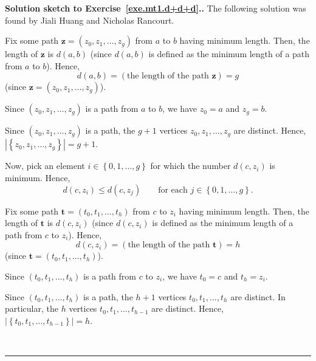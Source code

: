 \documentclass[numbers=enddot,12pt,final,onecolumn,notitlepage]{scrartcl}%
\theoremstyle{definition}
\newenvironment{proof}[1][Proof]{\noindent\textbf{#1.} }{\ \rule{0.5em}{0.5em}}
\newcommand{\set}[1]{\left\{ #1 \right\}}
\newcommand{\abs}[1]{\left| #1 \right|}
\newcommand{\tup}[1]{\left( #1 \right)}
\begin{document}
\begin{proof}[Solution sketch to Exercise~\ref{exe.mt1.d+d+d}.]
The following solution was found by Jiali Huang and
Nicholas Rancourt.

Fix some path $\mathbf{z} = \tup{z_0, z_1, \ldots, z_g}$ from
$a$ to $b$ having minimum length. Then, the length of $\mathbf{z}$ is
$d \tup{a, b}$ (since $d \tup{a, b}$ is defined as the minimum
length of a path from $a$ to $b$). Hence,
\begin{equation}
d \tup{a, b}
= \tup{\text{the length of the path } \mathbf{z}}
= g
\label{pf.exe.mt1.d+d+d.walk0}
\end{equation}
(since $\mathbf{z} = \tup{z_0, z_1, \ldots, z_g}$).

Since $\tup{z_0, z_1, \ldots, z_g}$ is a path from $a$ to $b$,
we have $z_0 = a$ and $z_g = b$.

Since $\tup{z_0, z_1, \ldots, z_g}$ is a path, the $g+1$
vertices $z_0, z_1, \ldots, z_g$ are distinct. Hence,
$\abs{\set{z_0, z_1, \ldots, z_g}} = g+1$.

Now, pick an element $i \in \set{0, 1, \ldots, g}$ for which the
number $d \tup{c, z_i}$ is minimum. Hence,
\begin{equation}
d \tup{c, z_i} \leq d \tup{c, z_j}
\qquad \text{for each } j \in \set{0, 1, \ldots, g} .
\label{sol.mt1.d+d+d.zi-minimum}
\end{equation}

Fix some path $\mathbf{t} = \tup{t_0, t_1, \ldots, t_h}$ from
$c$ to $z_i$ having minimum length. Then, the length of $\mathbf{t}$
is $d \tup{c, z_i}$ (since $d \tup{c, z_i}$ is defined as the
minimum length of a path from $c$ to $z_i$). Hence,
\[
d \tup{c, z_i}
= \tup{\text{the length of the path } \mathbf{t}}
= h
\]
(since $\mathbf{t} = \tup{t_0, t_1, \ldots, t_h}$).

Since $\tup{t_0, t_1, \ldots, t_h}$ is a path from $c$ to $z_i$,
we have $t_0 = c$ and $t_h = z_i$.

Since $\tup{t_0, t_1, \ldots, t_h}$ is a path, the $h+1$
vertices $t_0, t_1, \ldots, t_h$ are distinct. In particular,
the $h$ vertices $t_0, t_1, \ldots, t_{h-1}$ are distinct. Hence,
$\abs{\set{t_0, t_1, \ldots, t_{h-1}}} = h$.


\end{proof}
\end{document}
